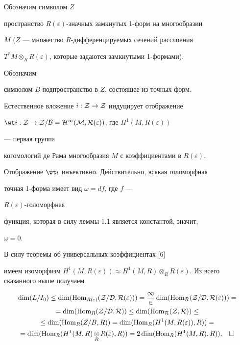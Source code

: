 Обозначим символом $Z$ 


пространство $R(\varepsilon)$-значных замкнутых 1-форм на многообразии 


$M$ ($Z$ --- множество $R$-дифференцируемых сечений расслоения 


$T^*M\otimes_R R(\varepsilon)$, которые задаются замкнутыми 1-формами). 


Обозначим 


символом $B$ подпространство в $Z$, состоящее из точных форм. 


 


Естественное вложение $i:\cal Z\to Z$ индуцирует отображение 


$\wt i:\cal Z\to Z/B=H^1(M,R(\varepsilon))$, где $H^1(M,R(\varepsilon))$ 


--- первая группа 


когомологий де Рама многообразия $M$ с коэффициентами в $R(\varepsilon)$. 


Отображение $\wt i$ инъективно. Действительно, всякая голоморфная 


точная 1-форма имеет вид $\omega=df$, где $f$ --- 


$R(\varepsilon)$-голоморфная 


функция, которая в силу леммы 1.1 является константой, значит, 


$\omega=0$. 


 


В силу теоремы об универсальных коэффициентах [6] 


имеем изоморфизм $H^1(M,R(\varepsilon))\approx H^1(M,R)\otimes_R 


R(\varepsilon)$. Из всего сказанного выше получаем 


\begin{multline*} 


\dim(L/I_0)\le\dim(\Hom_{R(\varepsilon)}(\cal Z/D,R(\varepsilon)))= 


\frac{1}{2}\dim(\Hom_R(\cal Z/D,R(\varepsilon))) = \\ 


% 


=\dim(\Hom_R(\cal Z/D,R))\le\dim(\Hom_R(\cal Z,R))\le \\ 


% 


\le\dim(\Hom_R(Z/B,R))=\dim(\Hom_R(H^1(M,R(\varepsilon)),R))= \\ 


% 


=\dim(\Hom_R(H^1(M,R)\mathop{\otimes}\limits_R 


R(\varepsilon),R))=2\dim(\Hom_R(H^1(M,R),R)). 


\quad\square 


\end{multline*} 



